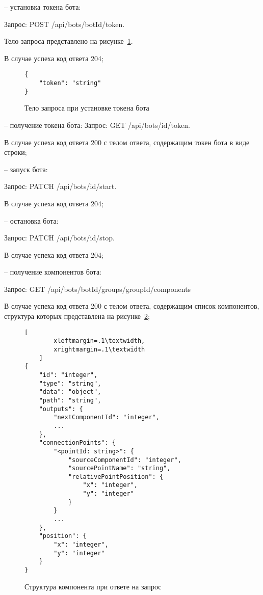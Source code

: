 -- \hspace{\clabelsep} установка токена бота:

Запрос: POST /api/bots/{botId}/token.

Тело запроса представлено на рисунке~\ref{f:set-token-request-body}.

В случае успеха код ответа 204;


\begin{figure}[ht]
	\centering
	\vspace{\toppaddingoffigure}
	\begin{lstlisting}
{
    "token": "string"
}
    \end{lstlisting}
	\caption{Тело запроса при установке токена бота}
	\label{f:set-token-request-body}
\end{figure}


-- \hspace{\clabelsep} получение токена бота:
Запрос: GET /api/bots/{id}/token.

В случае успеха код ответа 200 с телом ответа, содержащим токен бота
в виде строки;

-- \hspace{\clabelsep} запуск бота:

Запрос: PATCH /api/bots/{id}/start.

В случае успеха код ответа 204;

-- \hspace{\clabelsep} остановка бота:

Запрос: PATCH /api/bots/{id}/stop.

В случае успеха код ответа 204;

-- \hspace{\clabelsep} получение компонентов бота:

Запрос: GET /api/bots/{botId}/groups/{groupId}/components

В случае успеха код ответа 200 с телом ответа, содержащим список
компонентов, структура которых представлена
на рисунке~\ref{f:component-struct-in-response};


\begin{figure}[ht]
	\centering
	\vspace{\toppaddingoffigure}
	\begin{lstlisting}[
        xleftmargin=.1\textwidth,
        xrightmargin=.1\textwidth
    ]
{
    "id": "integer",
    "type": "string",
    "data": "object",
    "path": "string",
    "outputs": {
        "nextComponentId": "integer",
        ...
    },
    "connectionPoints": {
        "<pointId: string>": {
            "sourceComponentId": "integer",
            "sourcePointName": "string",
            "relativePointPosition": {
                "x": "integer",
                "y": "integer"
            }
        }
        ...
    },
    "position": {
        "x": "integer",
        "y": "integer"
    }
}
    \end{lstlisting}
	\caption{Структура компонента при ответе на запрос}
	\label{f:component-struct-in-response}
\end{figure}


